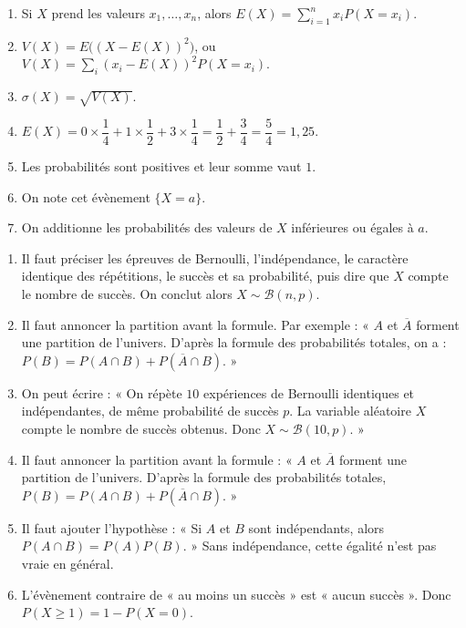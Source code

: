 \documentclass[11pt,a4paper]{article}
\newcounter{reponse}
\newenvironment{blocreponses}[1]{%
  \begin{tcolorbox}[
    enhanced,
    breakable,
    colback=bleuclair,
    colframe=bleufonce,
    boxrule=0.6pt,
    arc=2mm,
    left=2mm,right=2mm,top=2mm,bottom=1.5mm,
    title={\bfseries #1},
    coltitle=white,
    colbacktitle=bleufonce,
    before skip=3mm,
    after skip=3mm, fontupper=\large
  ]
  \large
  \begin{enumerate}[leftmargin=*,label=\textbf{\arabic*.},itemsep=0.45em,topsep=0.5em]
  \setcounter{enumi}{\value{reponse}}
}{%
  \setcounter{reponse}{\value{enumi}}
  \end{enumerate}
  \end{tcolorbox}
}
\begin{document}
\begin{blocreponses}{Réponses -- D. Variables aléatoires finies}
  \item Si $X$ prend les valeurs $x_1,\ldots,x_n$, alors $E(X)=\displaystyle\sum_{i=1}^n x_iP(X=x_i)$.
  \item $V(X)=E\bigl((X-E(X))^2\bigr)$, ou $V(X)=\displaystyle\sum_i (x_i-E(X))^2P(X=x_i)$.
  \item $\sigma(X)=\sqrt{V(X)}$.
  \item $E(X)=0\times\dfrac14+1\times\dfrac12+3\times\dfrac14=\dfrac12+\dfrac34=\dfrac54=1{,}25$.
  \item Les probabilités sont positives et leur somme vaut $1$.
  \item On note cet évènement $\{X=a\}$.
  \item On additionne les probabilités des valeurs de $X$ inférieures ou égales à $a$.
\end{blocreponses}

\begin{blocreponses}{Réponses -- E. Rédaction type bac}
  \item Il faut préciser les épreuves de Bernoulli, l'indépendance, le caractère identique des répétitions, le succès et sa probabilité, puis dire que $X$ compte le nombre de succès. On conclut alors $X\sim\mathcal B(n,p)$.
  \item Il faut annoncer la partition avant la formule. Par exemple : « $A$ et $\overline A$ forment une partition de l'univers. D'après la formule des probabilités totales, on a : $P(B)=P(A\cap B)+P(\overline A\cap B)$. »
  \item On peut écrire : « On répète $10$ expériences de Bernoulli identiques et indépendantes, de même probabilité de succès $p$. La variable aléatoire $X$ compte le nombre de succès obtenus. Donc $X\sim\mathcal B(10,p)$. »
  \item Il faut annoncer la partition avant la formule : « $A$ et $\overline A$ forment une partition de l'univers. D'après la formule des probabilités totales, $P(B)=P(A\cap B)+P(\overline A\cap B)$. »
  \item Il faut ajouter l'hypothèse : « Si $A$ et $B$ sont indépendants, alors $P(A\cap B)=P(A)P(B)$. » Sans indépendance, cette égalité n'est pas vraie en général.
  \item L'évènement contraire de « au moins un succès » est « aucun succès ». Donc $P(X\geqslant1)=1-P(X=0)$.
\end{blocreponses}

\clearpage
\end{document}
